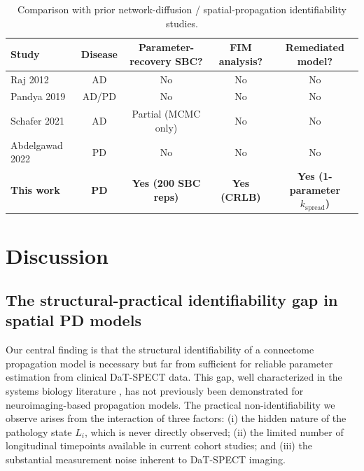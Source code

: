 \begin{table}[t]
\centering
\caption{Comparison with prior network-diffusion / spatial-propagation identifiability studies.}
\label{p8a:tab:competitors}
\footnotesize
\begin{tabular}{@{}lcccc@{}}
\toprule
Study & Disease & Parameter-recovery SBC? & FIM analysis? & Remediated model? \\
\midrule
Raj 2012~\cite{raj2012}             & AD    & No                   & No & No \\
Pandya 2019~\cite{pandya2019}       & AD/PD & No                   & No & No \\
Schafer 2021~\cite{schafer2021}     & AD    & Partial (MCMC only)  & No & No \\
Abdelgawad 2022~\cite{abdelgawad2022} & PD  & No                   & No & No \\
\textbf{This work}                   & \textbf{PD} & \textbf{Yes (200 SBC reps)} & \textbf{Yes (CRLB)} & \textbf{Yes (1-parameter $k_{\text{spread}}$)} \\
\bottomrule
\end{tabular}
\end{table}

\section{Discussion}

\subsection{The structural-practical identifiability gap in spatial PD models}

Our central finding is that the structural identifiability of a connectome propagation model is necessary but far from sufficient for reliable parameter estimation from clinical DaT-SPECT data. This gap, well characterized in the systems biology literature \cite{raue2009, wieland2021}, has not previously been demonstrated for neuroimaging-based propagation models. The practical non-identifiability we observe arises from the interaction of three factors: (i) the hidden nature of the pathology state $L_i$, which is never directly observed; (ii) the limited number of longitudinal timepoints available in current cohort studies; and (iii) the substantial measurement noise inherent to DaT-SPECT imaging.


